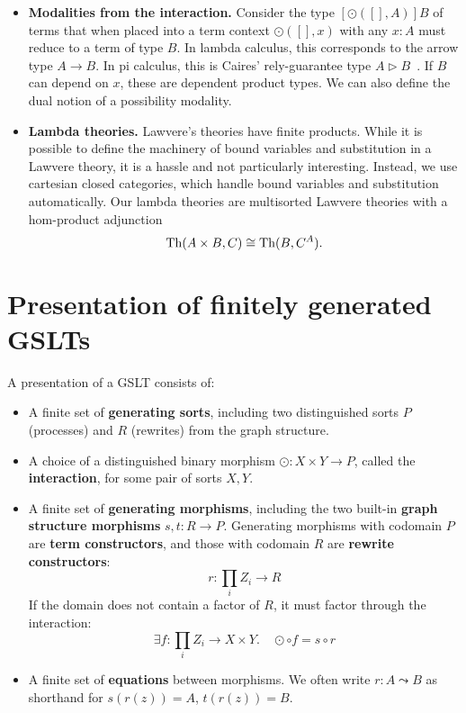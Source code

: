 \documentclass{article}
\begin{document}
\begin{itemize}
    \item {\bf Modalities from the interaction.}  Consider the type $[\odot([], A)] B$ of terms that when placed into a term context $\odot([], x)$ with any $x\colon A$ must reduce to a term of type $B$. In lambda calculus, this corresponds to the arrow type $A \to B$. In pi calculus, this is Caires' rely-guarantee type $A \triangleright B$~\cite{Caires2007}.  If $B$ can depend on $x$, these are dependent product types.  We can also define the dual notion of a possibility modality.

    \item {\bf Lambda theories.}  Lawvere's theories have finite products. While it is possible to define the machinery of bound variables and substitution in a Lawvere theory, it is a hassle and not particularly interesting. Instead, we use cartesian closed categories, which handle bound variables and substitution automatically.  Our lambda theories are multisorted Lawvere theories with a hom-product adjunction
$${\rm Th}(A \times B, C) \cong {\rm Th}(B, C^A).$$

\end{itemize}

\section{Presentation of finitely generated GSLTs}

A presentation of a GSLT consists of:

\begin{itemize}
    \item A finite set of \textbf{generating sorts}, including two distinguished sorts $P$ (processes) and $R$ (rewrites) from the graph structure.
    \item A choice of a distinguished binary morphism $\odot : X \times Y \to P$, called the \textbf{interaction}, for some pair of sorts $X, Y$.
    \item A finite set of \textbf{generating morphisms}, including the two built-in \textbf{graph structure morphisms} $s, t : R \to P$. Generating morphisms with codomain $P$ are \textbf{term constructors}, and those with codomain $R$ are \textbf{rewrite constructors}:
    \[
    r : \prod_i Z_i \to R
    \]
    If the domain does not contain a factor of $R$, it must factor through the interaction:
    \[
    \exists f : \prod_i Z_i \to X \times Y. \quad \odot \circ f = s \circ r
    \]
    \item A finite set of \textbf{equations} between morphisms. We often write $r : A \leadsto B$ as shorthand for $s(r(z)) = A$, $t(r(z)) = B$.
\end{itemize}
\end{document}
